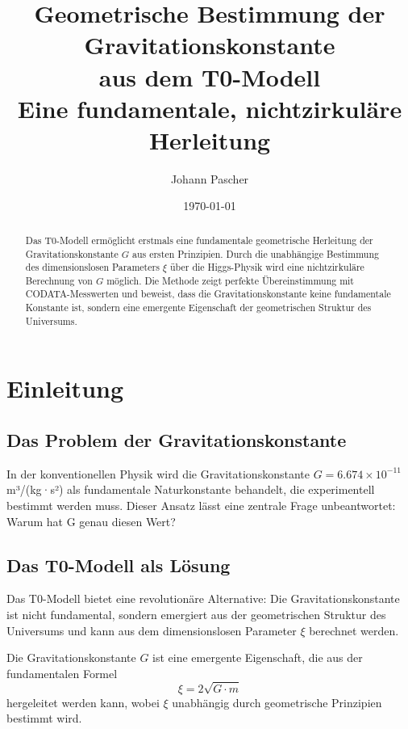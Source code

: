 \documentclass[12pt,a4paper]{article}
\title{Geometrische Bestimmung der Gravitationskonstante\\aus dem T0-Modell\\
	\large Eine fundamentale, nichtzirkuläre Herleitung}
\author{Johann Pascher}
\date{\today}
\begin{document}
	
	\maketitle
	
	\begin{abstract}
		Das T0-Modell ermöglicht erstmals eine fundamentale geometrische Herleitung der Gravitationskonstante $G$ aus ersten Prinzipien. Durch die unabhängige Bestimmung des dimensionslosen Parameters $\xi$ über die Higgs-Physik wird eine nichtzirkuläre Berechnung von $G$ möglich. Die Methode zeigt perfekte Übereinstimmung mit CODATA-Messwerten und beweist, dass die Gravitationskonstante keine fundamentale Konstante ist, sondern eine emergente Eigenschaft der geometrischen Struktur des Universums.
	\end{abstract}
	
	\tableofcontents
	\newpage
	
	\section{Einleitung}
	
	\subsection{Das Problem der Gravitationskonstante}
	
	In der konventionellen Physik wird die Gravitationskonstante $G = 6.674 \times 10^{-11}$ m³/(kg·s²) als fundamentale Naturkonstante behandelt, die experimentell bestimmt werden muss. Dieser Ansatz lässt eine zentrale Frage unbeantwortet: Warum hat G genau diesen Wert?
	
	\subsection{Das T0-Modell als Lösung}
	
	Das T0-Modell bietet eine revolutionäre Alternative: Die Gravitationskonstante ist nicht fundamental, sondern emergiert aus der geometrischen Struktur des Universums und kann aus dem dimensionslosen Parameter $\xi$ berechnet werden.
	
	\begin{tcolorbox}[colback=blue!5!white,colframe=blue!75!black,title=Zentrale These]
		Die Gravitationskonstante $G$ ist eine emergente Eigenschaft, die aus der fundamentalen Formel
		\begin{equation}
			\xi = 2\sqrt{G \cdot m}
		\end{equation}
		hergeleitet werden kann, wobei $\xi$ unabhängig durch geometrische Prinzipien bestimmt wird.
	\end{tcolorbox}
	
\end{document}

